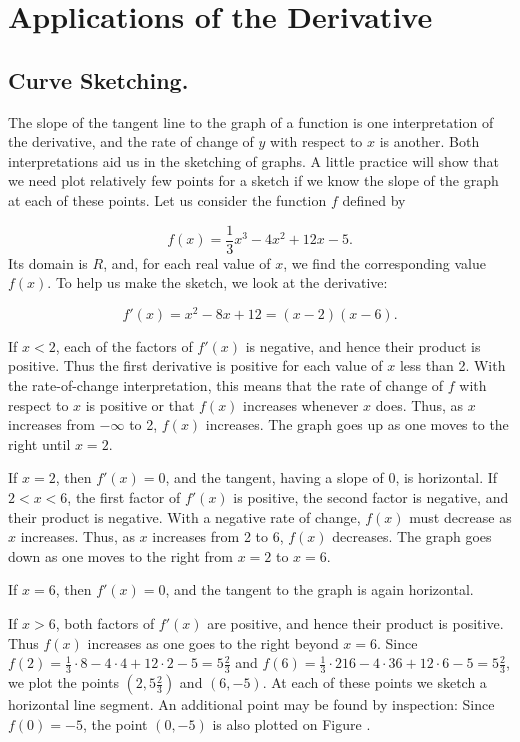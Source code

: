 \chapter{Applications of the Derivative} \label{chp 2}

\section{Curve Sketching.}\label{sec 2.1}
The slope of the tangent line to the graph of a function is one interpretation of the derivative, and the rate of change of $y$ with respect to $x$ is another. Both interpretations aid us in the sketching of graphs. A little practice will show that we need plot relatively few points for a sketch if we know the slope of the graph at each of these points. Let us consider the function $f$ defined by

$$
f(x) = \frac{1}{3} x^3 - 4x^2 + 12x - 5.
$$
Its domain is $R$, and, for each real value of $x$, we find the corresponding value $f(x)$. To help us make the sketch, we look at the derivative:

$$
f'(x) = x^2 - 8x + 12 = (x - 2)(x - 6).
$$

If $x < 2$, each of the factors of $f'(x)$ is negative, and hence their product is positive. Thus the first derivative is positive for each value of $x$ less than 2. With the rate-of-change interpretation, this means that the rate of change of $f$ with respect to $x$ is positive or that $f(x)$ increases whenever $x$ does. Thus, as $x$ increases from $-\infty$ to 2, $f(x)$ increases. The graph goes up as one moves to the right until $x = 2$.

If $x = 2$, then $f'(x) = 0$, and the tangent, having a slope of 0, is horizontal. If $2 < x < 6$, the first factor of $f'(x)$ is positive, the second factor is negative, and their product is negative. With a negative rate of change, $f(x)$ must decrease as $x$ increases. Thus, as $x$ increases from 2 to 6, $f(x)$ decreases. The graph goes down as one moves to the right from $x = 2$ to $x= 6$.

If $x = 6$, then $f'(x) = 0$, and the tangent to the graph is again horizontal.

If $x > 6$, both factors of $f'(x)$ are positive, and hence their product is positive. Thus $f(x)$ increases as one goes to the right beyond $x = 6$. 
Since $f(2) = \frac{1}{3} \cdot 8 - 4 \cdot 4 + 12 \cdot 2 - 5 = 5\frac{2}{3}$ and $f(6) = \frac{1}{3} \cdot 216 - 4 \cdot 36 + 12 \cdot 6 - 5 = 5\frac{2}{3}$, we plot the points $(2, 5\frac{2}{3})$ and $(6, -5)$. At each of these points we sketch a horizontal line segment. An additional point may be found by inspection: Since $f(0) = -5$, the point $(0, -5)$ is also plotted on Figure .

